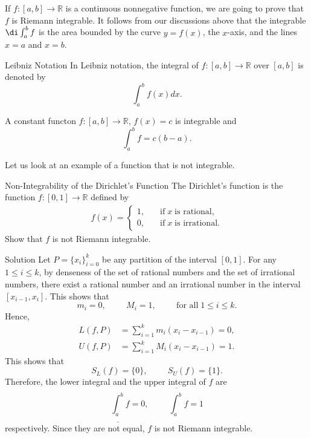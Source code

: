 \begin{remark}{}
If $f:[a,b]\to \mathbb{R}$ is a continuous nonnegative function, we are going to prove that $f$ is Riemann integrable.  It follows from our discussions above that 
the integrable $\di\int_a^b f$ is the area bounded by the curve $y=f(x)$, the $x$-axis, and the lines $x=a$ and $x=b$.
\end{remark}

\begin{highlight}{Leibniz Notation}
In Leibniz notation, the integral of $f:[a,b]\to\mathbb{R}$ over $[a,b]$ is denoted by \[\int_a^b f(x)dx.\]
\end{highlight}
\begin{example}{}
A constant functon $f:[a,b]\to\mathbb{R}$, $f(x)=c$  is integrable and 
\[\int_a^b f =c(b-a).\]
\end{example}

Let us look at an example of a function that is not integrable.
 \begin{example}[label=230220_9]
 {Non-Integrability of the Dirichlet's Function} The Dirichlet's function is the function $f:[0,1]\rightarrow\mathbb{R}$ defined by
 \begin{align*}
 f(x)=\begin{cases}1,\quad &\text{if}\; x\;\text{is rational},
 \\0,\quad &\text{if}\; x\;\text{is irrational}.\end{cases}
 \end{align*}
Show that $f$ is not Riemann integrable.
 \end{example}
\begin{solution}{Solution}
Let $P=\{x_i\}_{i=0}^k$ be any partition of the interval $[0,1]$. For any $1\leq i\leq k$, by denseness of the set of rational numbers and the set of irrational numbers, there exist a rational number and an irrational number in the interval $[x_{i-1}, x_i]$.  This shows that \[m_i=0,\hspace{1cm}M_i=1,\hspace{1cm}\text{for all}\;1\leq i\leq k.\]
Hence, 
\begin{align*}L(f,P)&=\sum_{i=1}^k m_i(x_i-x_{i-1})=0,\\ U(f,P)&=\sum_{i=1}^k M_i(x_i-x_{i-1})=1.\end{align*}
This shows that  
\[S_L(f)=\{0\},\hspace{1cm}S_U(f)=\{1\}.\]
Therefore, the lower integral and the upper integral of $f$ are
\[\underline{\int_a^b}f=0,\hspace{1cm}\overline{\int_a^b}f=1\]respectively. Since they are not equal, $f$ is not Riemann integrable.
\end{solution}

